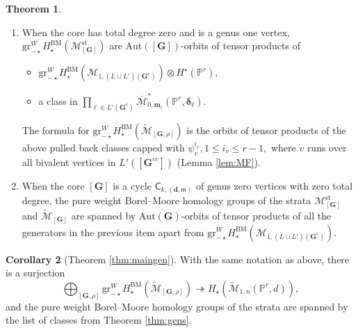 \documentclass[12pt,reqno]{amsart}
\theoremstyle{definition}
\theoremstyle{definition}
\theoremstyle{definition}
\theoremstyle{definition}
\newtheorem{theorem}{Theorem}[section]
\newtheorem{corollary}[theorem]{Corollary}
\newcommand{\ol}[1]{\overline{#1}}
\newcommand{\Mcal}{\mathcal{M}}
\newcommand{\Mbar}{\ol{\Mcal}}
\newcommand{\Mtil}{\widetilde{\mathcal{M}}}
\newcommand{\gr}{\mathrm{gr}}
\begin{document}
\begin{theorem}
\begin{enumerate}
\begin{enumerate}
        \item a class in $\prod_{\ell\in L'(\mathbf{G}^c)}\Mbar^*_{0, \boldsymbol{m}_{\ell}}(\mathbb{P}^r, \boldsymbol{\delta}_{\ell}).$
    \end{enumerate}
    The same formula holds for the stratum $\Mtil_{1,n}(\mathbb{P}^r,d),$ with $\mathrm{Aut}(\mathbf{G}, \rho)$ replacing $\mathrm{Aut}(\mathbf{G})$ in the case of $\Mtil_{[\mathbf{G},\rho]}.$
    \item When the core has total degree zero and is a genus one vertex, $\gr^{W}_{-\star}H_\star^{\mathrm{BM}}(\mathcal{M}^{\mathrm{st}}_{[\mathbf{G}]})$ are $\mathrm{Aut}([\mathbf{G}])$-orbits of tensor products of \begin{itemize}
      \item $\gr^{W}_{-\star}H_\star^{\mathrm{BM}}(\mathcal{M}_{1,(L\cup L')(\mathbf{G}^c)})\otimes H^\star(\mathbb{P}^r),$ 
      \item a class in $\prod_{\ell\in L'(\mathbf{G}^c)}\Mbar^*_{0, \boldsymbol{m}_{\ell}}(\mathbb{P}^r, \boldsymbol{\delta}_{\ell}).$
    \end{itemize}
    The formula for $\gr^{W}_{-\star}H_\star^{\mathrm{BM}}(\Mtil_{[\mathbf{G},\rho]})$ is the orbits of tensor products of the above pulled back classes capped with $\psi_v^{i_v}, 1\leq i_v\leq r-1,$ where $v$ runs over all bivalent vertices in $L'([\mathbf{G}^{cc}])$ (Lemma \ref{lem:MF}).

    \item When the core $[\mathbf{G}]$ is a cycle $\mathsf{C}_{k, (\mathbf{d}, \mathsf{m})}$ of genus zero vertices with zero total degree, the pure weight Borel--Moore homology groups of the strata $\mathcal{M}^{\mathrm{st}}_{[\mathbf{G}]}$ and $\Mtil_{[\mathbf{G}]}$ are spanned by $\mathrm{Aut}(\mathbf{G})$-orbits of tensor products of all the generators in the previous item apart from $\gr^{W}_{-\star}H_\star^{\mathrm{BM}}(\mathcal{M}_{1,(L\cup L')(\mathbf{G}^c)}).$
  \end{enumerate}
\end{theorem}

\begin{corollary}[Theorem \ref{thm:maingen}]\label{cor:maingen}
  With the same notation as above, there is a surjection $$\bigoplus_{[\mathbf{G},\rho]}\gr^{W}_{-\star}H_\star^{\mathrm{BM}}(\Mtil_{[\mathbf{G},\rho]}) \twoheadrightarrow H_\star(\Mtil_{1,n}(\mathbb{P}^r,d)),$$ and the pure weight Borel--Moore homology groups of the strata are spanned by the list of classes from Theorem \ref{thm:gens}.
\end{corollary}
\end{document}
